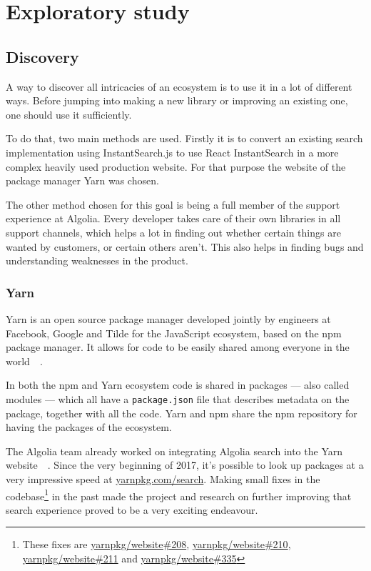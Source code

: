 
\chapter{Exploratory study} %
\label{chp:exploratory_study}

\section{Discovery}
\label{sec:discovery}

A way to discover all intricacies of an ecosystem is to use it in a lot of different ways. Before jumping into making a new library or improving an existing one, one should use it sufficiently. 

To do that, two main methods are used. Firstly it is to convert an existing search implementation using InstantSearch.js\cite{instantsearch-js} to use React InstantSearch in a more complex heavily used production website. For that purpose the website of the package manager Yarn\cite{yarn-site} was chosen.

The other method chosen for this goal is being a full member of the support experience at Algolia. Every developer takes care of their own libraries in all support channels, which helps a lot in finding out whether certain things are wanted by customers, or certain others aren't. This also helps in finding bugs and understanding weaknesses in the product.

\subsection{Yarn} %
\label{ssec:yarn}

Yarn is an open source package manager developed jointly by engineers at Facebook, Google and Tilde for the JavaScript ecosystem, based on the npm package manager. It allows for code to be easily shared among everyone in the world~\cite{yarn-site}~.

In both the npm and Yarn ecosystem code is shared in packages --- also called modules --- which all have a {\tt package.json} file that describes metadata on the package, together with all the code. Yarn and npm share the npm repository for having the packages of the ecosystem.

The Algolia team already worked on integrating Algolia search into the Yarn website~\cite{yarn-pr-add-algolia}~. Since the very beginning of 2017, it’s possible to look up packages at a very impressive speed at \href{https://yarnpkg.com/search}{yarnpkg.com/search}. Making small fixes in the codebase\footnote{These fixes are \href{https://github.com/yarnpkg/website/pulls/208}{yarnpkg/website\#208}, \href{https://github.com/yarnpkg/website/pulls/210}{yarnpkg/website\#210}, \href{https://github.com/yarnpkg/website/pulls211}{yarnpkg/website\#211} and \href{https://github.com/yarnpkg/website/pulls/335}{yarnpkg/website\#335}} in the past made the project and research on further improving that search experience proved to be a very exciting endeavour.

